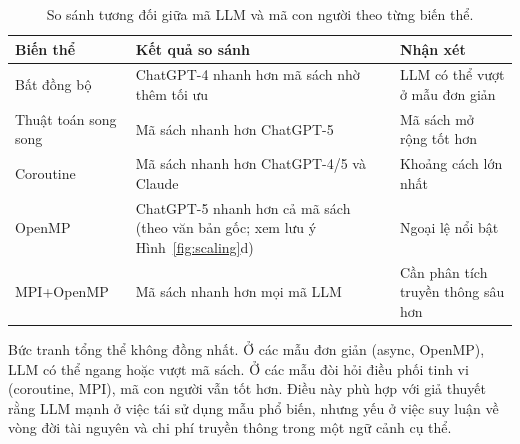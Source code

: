 \begin{table}[H]
\centering
\small
\caption{So sánh tương đối giữa mã LLM và mã con người theo từng biến thể.}
\label{tab:human}
\begin{tabularx}{\textwidth}{@{}p{3.2cm} X p{3.3cm}@{}}
\toprule
\textbf{Biến thể} & \textbf{Kết quả so sánh} & \textbf{Nhận xét} \\
\midrule
Bất đồng bộ & ChatGPT-4 nhanh hơn mã sách nhờ thêm tối ưu & LLM có thể vượt ở mẫu đơn giản \\
Thuật toán song song & Mã sách nhanh hơn ChatGPT-5 & Mã sách mở rộng tốt hơn \\
Coroutine & Mã sách nhanh hơn ChatGPT-4/5 và Claude & Khoảng cách lớn nhất \\
OpenMP & ChatGPT-5 nhanh hơn cả mã sách (theo văn bản gốc; xem lưu ý Hình~\ref{fig:scaling}d) & Ngoại lệ nổi bật \\
MPI+OpenMP & Mã sách nhanh hơn mọi mã LLM & Cần phân tích truyền thông sâu hơn \\
\bottomrule
\end{tabularx}
\end{table}

Bức tranh tổng thể không đồng nhất. Ở các mẫu đơn giản (async, OpenMP), LLM có
thể ngang hoặc vượt mã sách. Ở các mẫu đòi hỏi điều phối tinh vi (coroutine,
MPI), mã con người vẫn tốt hơn. Điều này phù hợp với giả thuyết rằng LLM mạnh ở
việc tái sử dụng mẫu phổ biến, nhưng yếu ở việc suy luận về vòng đời tài nguyên
và chi phí truyền thông trong một ngữ cảnh cụ thể.
